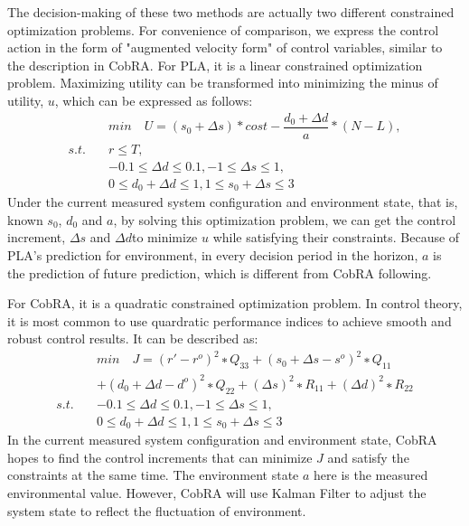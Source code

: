 \documentclass[sigconf]{acmart}
\begin{document}
The decision-making of these two methods are actually two different constrained optimization problems. For convenience of comparison, we express the control action in the form of "augmented velocity form" of control variables, similar to the description in CobRA. For PLA, it is a linear constrained optimization problem. Maximizing utility can be transformed into minimizing the minus of utility, $u$, which can be expressed as follows:
\begin{equation}
\begin{aligned}
&min\quad U=(s_0+\Delta s)*cost-\dfrac{d_0+\Delta d}{a}*(N-L), \\
s.t.\quad &r\leq T,\\
&-0.1\leq \Delta d\leq 0.1, -1\leq \Delta s\leq 1,\\
&0\leq d_0+\Delta d\leq 1,1\leq s_0+\Delta s\leq 3
\end{aligned}
\end{equation}
Under the current measured system configuration and environment state, that is, known $s_0$, $d_0$ and $a$, by solving this optimization problem, we can get the control increment, $\Delta s$ and $\Delta d$to minimize $u$ while satisfying their constraints. Because of PLA's prediction for environment, in every decision period in the horizon, $a$ is the prediction of future prediction, which is different from CobRA following.

For CobRA, it is a quadratic constrained optimization problem. In control theory, it is most common to use quardratic performance indices to achieve smooth and robust control results. It can be described as:
\begin{equation}
\begin{aligned}
&min\quad J=(r'-r^o)^2∗Q_{33}+(s_0+\Delta s-s^o )^2∗Q_{11}\\
&+(d_0+\Delta d-d^o)^2∗Q_{22}+(\Delta s)^{2}∗R_{11}+(\Delta d)^2∗R_{22}\\
s.t.\quad &-0.1\leq \Delta d\leq 0.1, -1\leq \Delta s\leq 1,\\
&0\leq d_0+\Delta d\leq 1,1\leq s_0+\Delta s\leq 3
\end{aligned}
\end{equation}
In the current measured system configuration and environment state, CobRA hopes to find the control increments that can minimize $J$ and satisfy the constraints at the same time. The environment state $a$ here is the measured environmental value. However, CobRA will use Kalman Filter to adjust the system state to reflect the fluctuation of environment.
 
\end{document}
